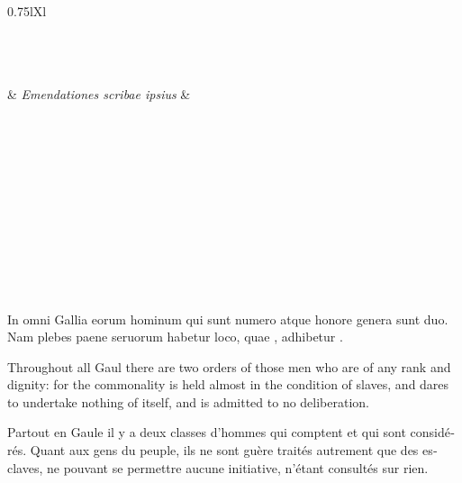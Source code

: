 \documentclass[12pt]{article}
\begin{document}
\begin{xltabular}[c]{0.75\linewidth}{lXl}
  \caption*{\textbf{Conspectus siglorum}\label{tab:conspectus-siglorum}}\\
  \\
  \\
  &  \emph{Emendationes scribae ipsius} & \\
  \\
  \\
  \\
  \\
  \\
  \\
  \\
  \\
  \\
  \\
  \\
\end{xltabular}

\cleartoevenpage

\begin{alignment}
  \begin{latin}
    In omni Gallia eorum hominum qui 
    sunt numero atque honore genera sunt duo. Nam plebes paene
    seruorum habetur loco, quae ,  adhibetur .
  \end{latin}
  \begin{english}
    Throughout all Gaul there are two orders of those men who are of
    any rank and dignity: for the commonality is held almost in the
    condition of slaves, and dares to undertake nothing of itself,
    and is admitted to no deliberation.
  \end{english}
  \begin{french}
    Partout en Gaule il y a deux classes d'hommes qui comptent et qui
    sont considérés. Quant aux gens du peuple, ils ne sont guère
    traités autrement que des esclaves, ne pouvant se permettre aucune
    initiative, n'étant consultés sur rien.
  \end{french}
\end{alignment}
\end{document}
